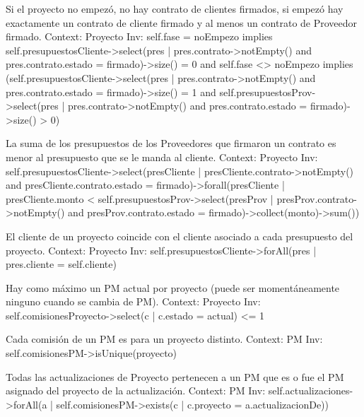 \begin{listocl}
\begin{itemocl}{Si el proyecto no empezó, no hay contrato de clientes firmados, si empezó hay exactamente un contrato de cliente firmado y al menos un contrato de Proveedor firmado.}
Context: Proyecto
Inv: self.fase = noEmpezo implies self.presupuestosCliente->select(pres | pres.contrato->notEmpty() and pres.contrato.estado = firmado)->size() = 0 and self.fase <> noEmpezo implies (self.presupuestosCliente->select(pres | pres.contrato->notEmpty() and pres.contrato.estado = firmado)->size() = 1 and self.presupuestosProv->select(pres | pres.contrato->notEmpty() and pres.contrato.estado = firmado)->size() > 0)
\end{itemocl}

\begin{itemocl}{La suma de los presupuestos de los Proveedores que firmaron un contrato es menor al presupuesto que se le manda al cliente.}
Context: Proyecto
Inv: self.presupuestosCliente->select(presCliente | presCliente.contrato->notEmpty() and presCliente.contrato.estado = firmado)->forall(presCliente | presCliente.monto < self.presupuestosProv->select(presProv | presProv.contrato->notEmpty() and presProv.contrato.estado = firmado)->collect(monto)->sum())
\end{itemocl}

\begin{itemocl}{El cliente de un proyecto coincide con el cliente asociado a cada presupuesto del proyecto.}
Context: Proyecto
Inv: self.presupuestosCliente->forAll(pres | pres.cliente = self.cliente)
\end{itemocl}

\begin{itemocl}{Hay como máximo un PM actual por proyecto (puede ser momentáneamente ninguno cuando se cambia de PM).}
Context: Proyecto
Inv: self.comisionesProyecto->select(c | c.estado = actual) <= 1
\end{itemocl}

\begin{itemocl}{Cada comisión de un PM es para un proyecto distinto.}
Context: PM
Inv: self.comisionesPM->isUnique(proyecto)
\end{itemocl}

\begin{itemocl}{Todas las actualizaciones de Proyecto pertenecen a un PM que es o fue el PM asignado del proyecto de la actualización.}
Context: PM
Inv: self.actualizaciones->forAll(a | self.comisionesPM->exists(c | c.proyecto = a.actualizacionDe))
\end{itemocl}


\end{listocl}
